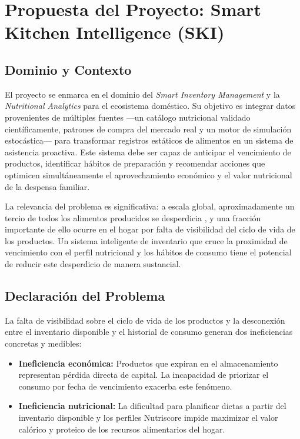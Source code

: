 \documentclass[12pt,a4paper]{article}
\begin{document}
\section{Propuesta del Proyecto: Smart Kitchen Intelligence (SKI)}

\subsection{Dominio y Contexto}

El proyecto se enmarca en el dominio del \textit{Smart Inventory Management} y la \textit{Nutritional Analytics} para el ecosistema doméstico. Su objetivo es integrar datos provenientes de múltiples fuentes —un catálogo nutricional validado científicamente, patrones de compra del mercado real y un motor de simulación estocástica— para transformar registros estáticos de alimentos en un sistema de asistencia proactiva. Este sistema debe ser capaz de anticipar el vencimiento de productos, identificar hábitos de preparación y recomendar acciones que optimicen simultáneamente el aprovechamiento económico y el valor nutricional de la despensa familiar.

La relevancia del problema es significativa: a escala global, aproximadamente un tercio de todos los alimentos producidos se desperdicia \cite{fao2019}, y una fracción importante de ello ocurre en el hogar por falta de visibilidad del ciclo de vida de los productos. Un sistema inteligente de inventario que cruce la proximidad de vencimiento con el perfil nutricional y los hábitos de consumo tiene el potencial de reducir este desperdicio de manera sustancial.

\subsection{Declaración del Problema}

La falta de visibilidad sobre el ciclo de vida de los productos y la desconexión entre el inventario disponible y el historial de consumo generan dos ineficiencias concretas y medibles:

\begin{itemize}
    \item \textbf{Ineficiencia económica:} Productos que expiran en el almacenamiento representan pérdida directa de capital. La incapacidad de priorizar el consumo por fecha de vencimiento exacerba este fenómeno.
    \item \textbf{Ineficiencia nutricional:} La dificultad para planificar dietas a partir del inventario disponible y los perfiles Nutriscore impide maximizar el valor calórico y proteico de los recursos alimentarios del hogar.
\end{itemize}
\end{document}
